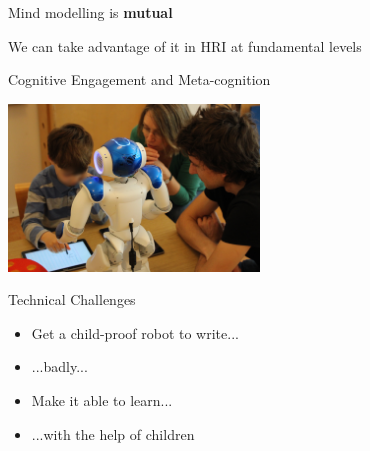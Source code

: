 \documentclass[compress]{beamer}
\begin{document}

\begin{frame}[plain]{}
    \centering
    Mind modelling is {\bf mutual}

    We can take advantage of it in HRI at fundamental levels

\end{frame}

{
\begin{frame}{Cognitive Engagement and Meta-cognition}

    \begin{flushright}
        \includegraphics[width=0.5\textwidth]{cowriter/henry}
    \end{flushright}

\end{frame}
}

\begin{frame}{Technical Challenges}
    \begin{itemize}
        \item<1-> Get a child-proof robot to write...
        \item<2-> ...badly...
        \item<3-> Make it able to learn...
        \item<4-> ...with the help of children
    \end{itemize}
\end{frame}
\end{document}
